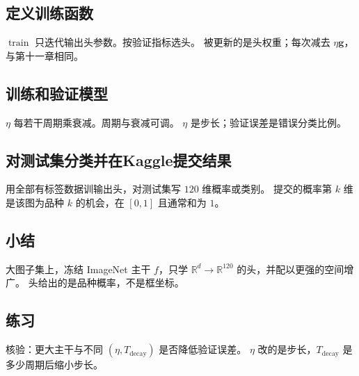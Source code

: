 \subsection{定义训练函数}

$\operatorname{train}$ 只迭代输出头参数。按验证指标选头。
被更新的是头权重；每次减去 $\eta\bm{g}$，与第十一章相同。

\subsection{训练和验证模型}

$\eta$ 每若干周期乘衰减。周期与衰减可调。
$\eta$ 是步长；验证误差是错误分类比例。

\subsection{对测试集分类并在Kaggle提交结果}

用全部有标签数据训输出头，对测试集写 $120$ 维概率或类别。
提交的概率第 $k$ 维是该图为品种 $k$ 的机会，在 $[0,1]$ 且通常和为 $1$。

\subsection{小结}

大图子集上，冻结 ImageNet 主干 $f$，只学
$\mathbb{R}^{d}\to\mathbb{R}^{120}$ 的头，并配以更强的空间增广。
头给出的是品种概率，不是框坐标。

\subsection{练习}

核验：更大主干与不同 $(\eta,T_{\mathrm{decay}})$ 是否降低验证误差。
$\eta$ 改的是步长，$T_{\mathrm{decay}}$ 是多少周期后缩小步长。

